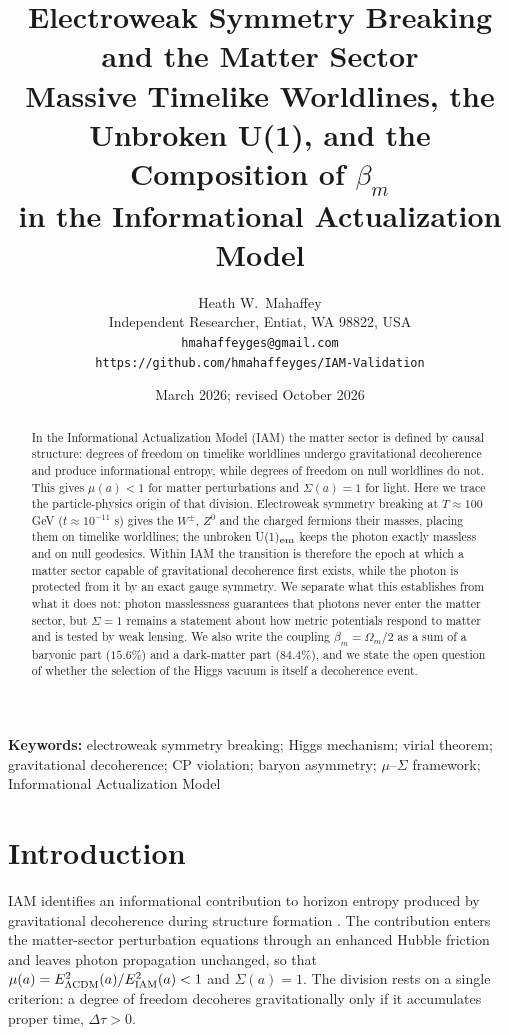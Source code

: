 \documentclass[12pt,a4paper]{article}
\title{\textbf{Electroweak Symmetry Breaking and the Matter Sector}\\
\large Massive Timelike Worldlines, the Unbroken U(1), and the Composition of $\beta_m$\\
in the Informational Actualization Model}
\author{Heath W.\ Mahaffey\\
\small Independent Researcher, Entiat, WA 98822, USA\\
\small \texttt{hmahaffeyges@gmail.com}\\
\small \texttt{https://github.com/hmahaffeyges/IAM-Validation}}
\date{March 2026; revised October 2026}
\begin{document}
\maketitle

\begin{abstract}
In the Informational Actualization Model (IAM) the matter sector is defined by
causal structure: degrees of freedom on timelike worldlines undergo gravitational
decoherence and produce informational entropy, while degrees of freedom on null
worldlines do not. This gives $\mu(a)<1$ for matter perturbations and $\Sigma(a)=1$
for light. Here we trace the particle-physics origin of that division. Electroweak
symmetry breaking at $T\approx100$ GeV ($t\approx10^{-11}$ s) gives the $W^\pm$,
$Z^0$ and the charged fermions their masses, placing them on timelike worldlines;
the unbroken U(1)$_{\rm em}$ keeps the photon exactly massless and on null
geodesics. Within IAM the transition is therefore the epoch at which a matter
sector capable of gravitational decoherence first exists, while the photon is
protected from it by an exact gauge symmetry. We separate what this establishes
from what it does not: photon masslessness guarantees that photons never enter
the matter sector, but $\Sigma=1$ remains a statement about how metric potentials
respond to matter and is tested by weak lensing. We also write the coupling
$\beta_m=\Omega_m/2$ as a sum of a baryonic part ($15.6\%$) and a dark-matter part
($84.4\%$), and we state the open question of whether the selection of the Higgs
vacuum is itself a decoherence event.
\end{abstract}

\noindent\textbf{Keywords:} electroweak symmetry breaking; Higgs mechanism; virial
theorem; gravitational decoherence; CP violation; baryon asymmetry; $\mu$--$\Sigma$
framework; Informational Actualization Model

\section{Introduction}
\label{sec:intro}

IAM identifies an informational contribution to horizon entropy produced by
gravitational decoherence during structure formation \citep{mahaffey2026}. The
contribution enters the matter-sector perturbation equations through an enhanced
Hubble friction and leaves photon propagation unchanged, so that
$\mu(a)=E^2_{\Lambda\rm CDM}(a)/E^2_{\rm IAM}(a)<1$ and $\Sigma(a)=1$. The division
rests on a single criterion: a degree of freedom decoheres gravitationally only if
it accumulates proper time, $\Delta\tau>0$.
\end{document}
